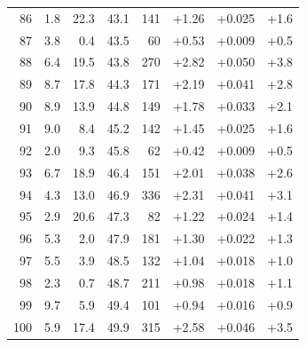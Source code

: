 \begin{longtable}{@{}r r r r r r r r@{}}
86 & 1.8 & 22.3 & 43.1 & 141 & \cellcolor{green!24}+1.26 & \cellcolor{yellow!26}+0.025 & \cellcolor{orange!23}+1.6 \\
87 & 3.8 & 0.4 & 43.5 & 60 & \cellcolor{green!16}+0.53 & \cellcolor{yellow!16}+0.009 & \cellcolor{orange!15}+0.5 \\
88 & 6.4 & 19.5 & 43.8 & 270 & \cellcolor{green!40}+2.82 & \cellcolor{yellow!40}+0.050 & \cellcolor{orange!38}+3.8 \\
89 & 8.7 & 17.8 & 44.3 & 171 & \cellcolor{green!33}+2.19 & \cellcolor{yellow!35}+0.041 & \cellcolor{orange!31}+2.8 \\
90 & 8.9 & 13.9 & 44.8 & 149 & \cellcolor{green!29}+1.78 & \cellcolor{yellow!30}+0.033 & \cellcolor{orange!26}+2.1 \\
91 & 9.0 & 8.4 & 45.2 & 142 & \cellcolor{green!26}+1.45 & \cellcolor{yellow!25}+0.025 & \cellcolor{orange!22}+1.6 \\
92 & 2.0 & 9.3 & 45.8 & 62 & \cellcolor{green!15}+0.42 & \cellcolor{yellow!16}+0.009 & \cellcolor{orange!15}+0.5 \\
93 & 6.7 & 18.9 & 46.4 & 151 & \cellcolor{green!31}+2.01 & \cellcolor{yellow!33}+0.038 & \cellcolor{orange!29}+2.6 \\
94 & 4.3 & 13.0 & 46.9 & 336 & \cellcolor{green!34}+2.31 & \cellcolor{yellow!35}+0.041 & \cellcolor{orange!33}+3.1 \\
95 & 2.9 & 20.6 & 47.3 & 82 & \cellcolor{green!23}+1.22 & \cellcolor{yellow!25}+0.024 & \cellcolor{orange!22}+1.4 \\
96 & 5.3 & 2.0 & 47.9 & 181 & \cellcolor{green!24}+1.30 & \cellcolor{yellow!23}+0.022 & \cellcolor{orange!21}+1.3 \\
97 & 5.5 & 3.9 & 48.5 & 132 & \cellcolor{green!21}+1.04 & \cellcolor{yellow!21}+0.018 & \cellcolor{orange!19}+1.0 \\
98 & 2.3 & 0.7 & 48.7 & 211 & \cellcolor{green!21}+0.98 & \cellcolor{yellow!21}+0.018 & \cellcolor{orange!19}+1.1 \\
99 & 9.7 & 5.9 & 49.4 & 101 & \cellcolor{green!20}+0.94 & \cellcolor{yellow!20}+0.016 & \cellcolor{orange!18}+0.9 \\
100 & 5.9 & 17.4 & 49.9 & 315 & \cellcolor{green!37}+2.58 & \cellcolor{yellow!38}+0.046 & \cellcolor{orange!36}+3.5 \\
\end{longtable}
